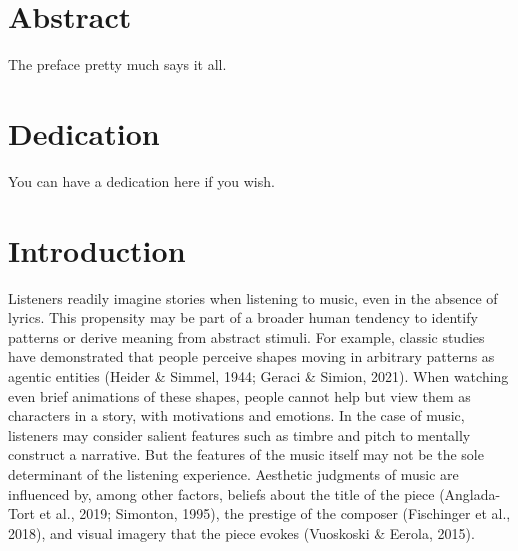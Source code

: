 \documentclass[12pt,twoside]{reedthesis}
\begin{document}
    \tableofcontents
    \listoftables
    \listoffigures

    \chapter*{Abstract}
	The preface pretty much says it all.
	
	\chapter*{Dedication}
	You can have a dedication here if you wish.

  \mainmatter %
  \pagestyle{fancyplain} %


    \chapter*{Introduction}

\doublespacing

Listeners readily imagine stories when listening to music, even in the absence of lyrics. This propensity may be part of a broader human tendency to identify patterns or derive meaning from abstract stimuli. For example, classic studies have demonstrated that people perceive shapes moving in arbitrary patterns as agentic entities (Heider \& Simmel, 1944; Geraci \& Simion, 2021). When watching even brief animations of these shapes, people cannot help but view them as characters in a story, with motivations and emotions. In the case of music, listeners may consider salient features such as timbre and pitch to mentally construct a narrative. But the features of the music itself may not be the sole determinant of the listening experience. Aesthetic judgments of music are influenced by, among other factors, beliefs about the title of the piece (Anglada-Tort et al., 2019; Simonton, 1995), the prestige of the composer (Fischinger et al., 2018), and visual imagery that the piece evokes (Vuoskoski \& Eerola, 2015). 
\end{document}
